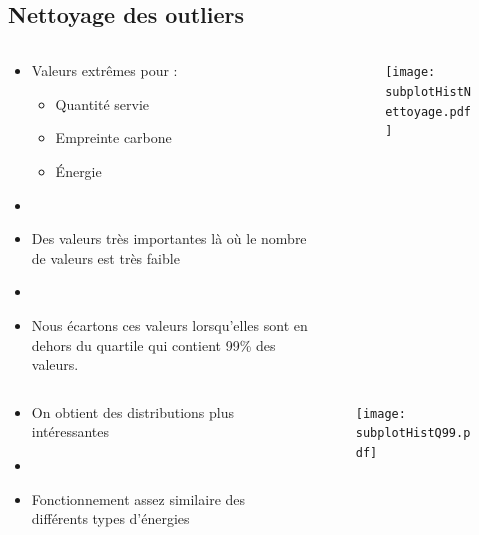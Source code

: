 \subsection{Nettoyage des outliers}
\begin{frame}{\insertsubsection}
  \begin{columns}
    \begin{column}{.3\textwidth}
      \begin{itemize}
        \item Valeurs extrêmes pour :
              \begin{itemize}
                \item Quantité servie
                \item Empreinte carbone
                \item Énergie
              \end{itemize}
        \item[]
        \item Des valeurs très importantes là où le nombre de valeurs est très faible
        \item[]
        \item Nous écartons ces valeurs lorsqu'elles sont en dehors du quartile qui contient 99\% des valeurs.
      \end{itemize}
    \end{column}
    \begin{column}{.7\textwidth}
      \begin{figure}
        \texttt{[image: subplotHistNettoyage.pdf]}
      \end{figure}
    \end{column}
  \end{columns}
\end{frame}

\begin{frame}{\insertsubsection}
  \begin{columns}
    \begin{column}{.3\textwidth}
      \begin{itemize}
        \item On obtient des distributions plus intéressantes
        \item[]
        \item Fonctionnement assez similaire des différents types d'énergies
      \end{itemize}
    \end{column}
    \begin{column}{.7\textwidth}
      \begin{figure}
        \texttt{[image: subplotHistQ99.pdf]}
      \end{figure}
    \end{column}
  \end{columns}
\end{frame}

